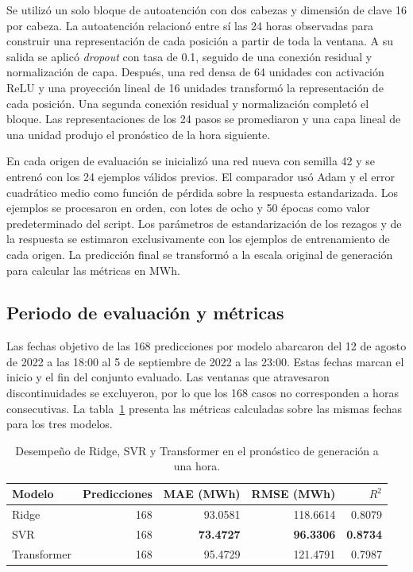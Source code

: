 Se utilizó un solo bloque de autoatención con dos cabezas y dimensión de clave 16 por cabeza. La autoatención relacionó entre sí las 24 horas observadas para construir una representación de cada posición a partir de toda la ventana. A su salida se aplicó \textit{dropout} con tasa de 0.1, seguido de una conexión residual y normalización de capa. Después, una red densa de 64 unidades con activación ReLU y una proyección lineal de 16 unidades transformó la representación de cada posición. Una segunda conexión residual y normalización completó el bloque. Las representaciones de los 24 pasos se promediaron y una capa lineal de una unidad produjo el pronóstico de la hora siguiente.

En cada origen de evaluación se inicializó una red nueva con semilla 42 y se entrenó con los 24 ejemplos válidos previos. El comparador usó Adam y el error cuadrático medio como función de pérdida sobre la respuesta estandarizada. Los ejemplos se procesaron en orden, con lotes de ocho y 50 épocas como valor predeterminado del script. Los parámetros de estandarización de los rezagos y de la respuesta se estimaron exclusivamente con los ejemplos de entrenamiento de cada origen. La predicción final se transformó a la escala original de generación para calcular las métricas en MWh.

\subsection{Periodo de evaluación y métricas}

Las fechas objetivo de las 168 predicciones por modelo abarcaron del 12 de agosto de 2022 a las 18:00 al 5 de septiembre de 2022 a las 23:00. Estas fechas marcan el inicio y el fin del conjunto evaluado. Las ventanas que atravesaron discontinuidades se excluyeron, por lo que los 168 casos no corresponden a horas consecutivas. La tabla~\ref{tab:ridge-svr-transformer} presenta las métricas calculadas sobre las mismas fechas para los tres modelos.

\begin{table}[htbp]
    \centering
    \caption{Desempeño de Ridge, SVR y Transformer en el pronóstico de generación a una hora.}
    \label{tab:ridge-svr-transformer}
    \begin{tabular}{lrrrr}
        \toprule
        Modelo & Predicciones & MAE (MWh) & RMSE (MWh) & $R^2$ \\
        \midrule
        Ridge       & 168 & 93.0581 & 118.6614 & 0.8079 \\
        SVR         & 168 & \textbf{73.4727} & \textbf{96.3306} & \textbf{0.8734} \\
        Transformer & 168 & 95.4729 & 121.4791 & 0.7987 \\
        \bottomrule
    \end{tabular}
\end{table}

